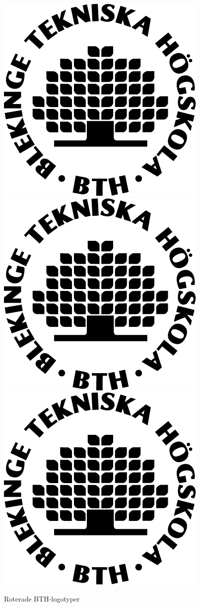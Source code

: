\documentclass[a4paper]{article}
\begin{document}
\begin{figure}[h]
\centering
\includegraphics[scale=0.9, angle=20]{bth_logo.jpg}
\includegraphics[scale=0.8, angle=40]{bth_logo.jpg}
\includegraphics[scale=0.7, angle=60]{bth_logo.jpg}
\caption{Roterade BTH-logotyper}
\label{fig:Logo}
\end{figure}
\end{document}
